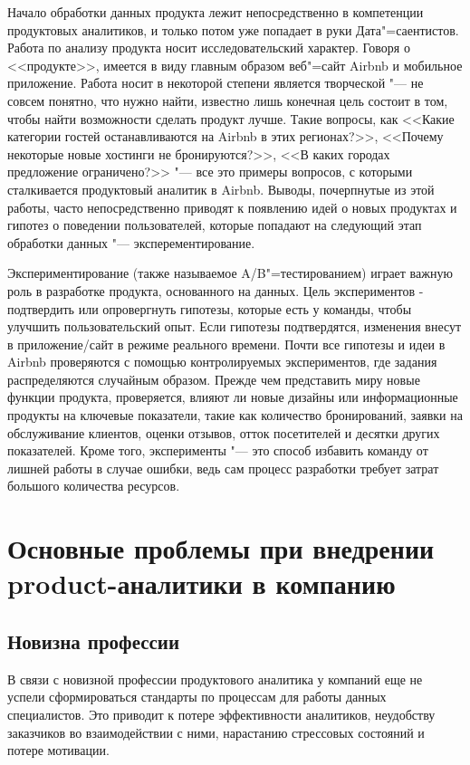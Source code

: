 \documentclass[referat, times]{SCWorks}
\begin{document}
Начало обработки данных продукта лежит непосредственно в компетенции продуктовых аналитиков, и только потом уже попадает в руки Дата"=саентистов.
Работа по анализу продукта носит исследовательский характер. Говоря о <<продукте>>, имеется в виду главным образом веб"=сайт Airbnb и мобильное приложение. Работа носит в некоторой степени является творческой "--- не совсем понятно, что нужно найти, известно лишь конечная цель состоит в том, чтобы найти возможности сделать продукт лучше. Такие вопросы, как <<Какие категории гостей останавливаются на Airbnb в этих регионах?>>, <<Почему некоторые новые хостинги не бронируются?>>, <<В каких городах предложение ограничено?>> "--- все это примеры вопросов, с которыми сталкивается продуктовый аналитик в Airbnb. Выводы, почерпнутые из этой работы, часто непосредственно приводят к появлению идей о новых продуктах и гипотез о поведении пользователей, которые попадают на следующий этап обработки данных "--- эксперементирование. 

Экспериментирование (также называемое A/B"=тестированием) играет важную роль в разработке продукта, основанного на данных. Цель экспериментов - подтвердить или опровергнуть гипотезы, которые есть у команды, чтобы улучшить пользовательский опыт. Если гипотезы подтвердятся, изменения внесут в приложение/сайт в режиме реального времени. Почти все гипотезы и идеи в Airbnb проверяются с помощью контролируемых экспериментов, где задания распределяются случайным образом. Прежде чем представить миру новые функции продукта,  проверяется, влияют ли новые дизайны или информационные продукты на ключевые показатели, такие как количество бронирований, заявки на обслуживание клиентов, оценки отзывов, отток посетителей и десятки других показателей. Кроме того, эксперименты "--- это способ избавить команду от лишней работы в случае ошибки, ведь сам процесс разработки требует затрат большого количества ресурсов\cite{airbnb}. 

\section{Основные проблемы при внедрении product-аналитики в компанию}
\subsection{Новизна профессии}
В связи с новизной профессии продуктового аналитика у компаний еще не успели сформироваться стандарты по процессам для работы данных специалистов. Это приводит к потере эффективности аналитиков, неудобству заказчиков во взаимодействии с ними, нарастанию стрессовых состояний и потере мотивации.
\end{document}
